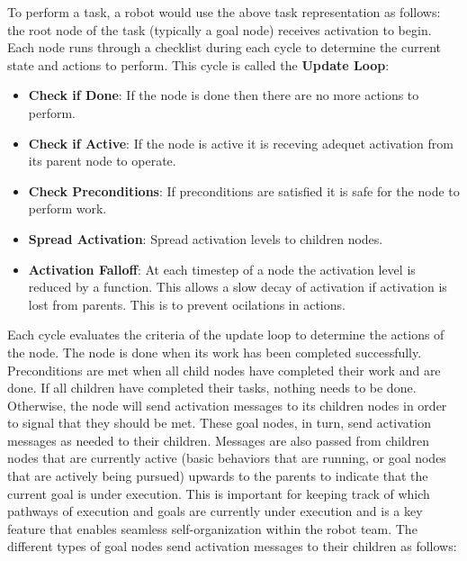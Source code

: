 \documentclass[conference]{article}
\begin{document}
To perform a task, a robot would use the above task representation as follows: the root node of the task (typically a goal node) receives activation to begin. Each node runs through a checklist during each cycle to determine the current state and actions to perform. This cycle is called the \textbf{Update Loop}:
\begin{itemize}
\item \textbf{Check if Done}: If the node is done then there are no more actions to perform.
\item \textbf{Check if Active}: If the node is active it is receving adequet activation from its parent node to operate.
\item \textbf{Check Preconditions}: If preconditions are satisfied it is safe for the node to perform work.
\item \textbf{Spread Activation}: Spread activation levels to children nodes.
\item \textbf{Activation Falloff}: At each timestep of a node the activation level is reduced by a function. This allows a slow decay of activation if activation is lost from parents. This is to prevent ocilations in actions.
\end{itemize}
Each cycle evaluates the criteria of the update loop to determine the actions of the node. The node is done when its work has been completed successfully. Preconditions are met when all child nodes have completed their work and are done. If all children have completed their tasks, nothing needs to be done. Otherwise, the node will send activation messages to its children nodes in order to signal that they should be met. These goal nodes, in turn, send activation messages as needed to their children. Messages are also passed from children nodes that are currently active (basic behaviors that are running, or goal nodes that are actively being pursued) upwards to the parents to indicate that the current goal is under execution. This is important for keeping track of which pathways of execution and goals are currently under execution and is a key feature that enables seamless self-organization within the robot team. The different types of goal nodes send activation messages to their children as follows:
\end{document}
